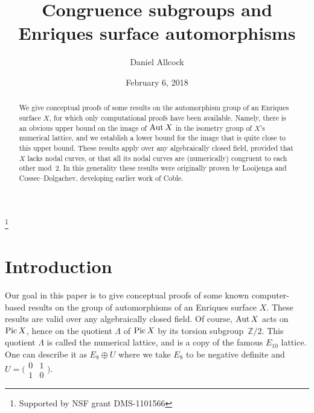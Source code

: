 \documentclass[12pt]{amsart}
\def\Pic{\mathop{\rm Pic}\nolimits}
\def\Aut{\mathop{\rm Aut}\nolimits}
\def\Z{\mathbb{Z}}     %
\numberwithin{theorem}{section}
\numberwithin{equation}{section}
\numberwithin{figure}{section}
\theoremstyle{remark}
\begin{document}
\title[Congruence subgroups and Enriques surfaces]{Congruence subgroups and Enriques surface automorphisms}
%
\author{Daniel Allcock}
\thanks{Supported by NSF grant DMS-1101566}
\address{Department of Mathematics\\University of Texas, Austin}
%
\date{February 6, 2018}

\begin{abstract}
  We give conceptual proofs of some results on the automorphism group
  of an Enriques surface $X$, for which only computational proofs have
  been available.  Namely, there is an obvious upper bound on the
  image of $\Aut X$ in the isometry group of $X$'s numerical lattice,
  and we establish a lower bound for the image that is quite close to
  this upper bound.  These results apply over any algebraically closed
  field, provided that $X$ lacks nodal curves, or that all its nodal
  curves are (numerically) congruent to each other mod~$2$.  In this
  generality these results were originally proven by Looijenga and
  Cossec--Dolgachev, developing earlier work of Coble.
\end{abstract}

\maketitle

\section{Introduction}
\label{sec-introduction}

\noindent
Our goal in this paper is to give conceptual proofs of some known
computer-based results on the group of automorphisms of an Enriques
surface $X$.  These results are valid over any algebraically closed
field.  Of course, $\Aut X$ acts on $\Pic X$, hence on the quotient
$\Lambda$ of $\Pic X$ by its torsion subgroup~$\Z/2$.  This quotient
$\Lambda$ is called the numerical lattice, and is a copy of the famous
$E_{10}$ lattice.  One can describe it as $E_8\oplus U$ where we take
$E_8$ to be negative definite and
$U=\bigl(\begin{smallmatrix}0&1\\1&0\end{smallmatrix}\bigr)$.
\end{document}
